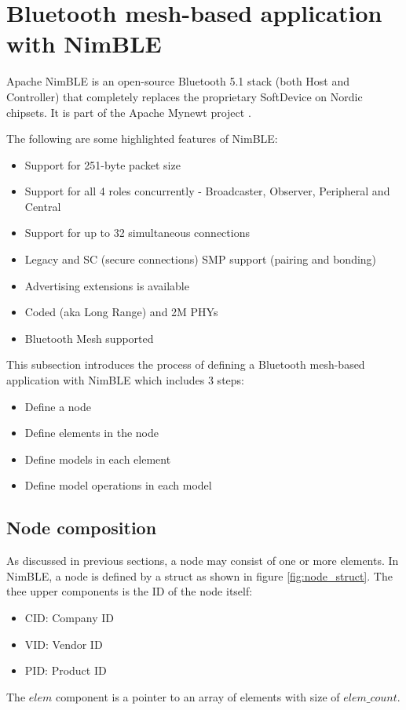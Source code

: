 \documentclass[\main/main.tex]{subfiles}
\begin{document}
\section{Bluetooth mesh-based application with NimBLE}
\label{sec:bluetooth_mesh_based_application_with_nimble}
Apache NimBLE is an open-source Bluetooth 5.1 stack (both Host and Controller) that completely replaces the proprietary SoftDevice on Nordic chipsets. It is part of the Apache Mynewt project \cite{web_nimble}.

The following are some highlighted features of NimBLE:
\begin{itemize}
    \item Support for 251-byte packet size
    \item Support for all 4 roles concurrently - Broadcaster, Observer, Peripheral and Central
    \item Support for up to 32 simultaneous connections
    \item Legacy and SC (secure connections) SMP support (pairing and bonding)
    \item Advertising extensions is available
    \item Coded (aka Long Range) and 2M PHYs
    \item Bluetooth Mesh supported
\end{itemize}

This subsection introduces the process of defining a Bluetooth mesh-based application with NimBLE which includes 3 steps:
\begin{itemize}
    \item Define a node
    \item Define elements in the node
    \item Define models in each element
    \item Define model operations in each model
\end{itemize}
\subsection{Node composition}
As discussed in previous sections, a node may consist of one or more elements. In NimBLE, a node is defined by a struct as shown in figure \ref{fig:node_struct}. The thee upper components is the ID of the node itself:
\begin{itemize}
    \item CID: Company ID
    \item VID: Vendor ID
    \item PID: Product ID
\end{itemize}
The $elem$ component is a pointer to an array of elements with  size of $elem\_count$.
\end{document}
